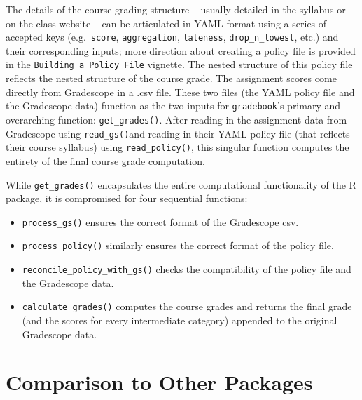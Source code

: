 \documentclass[10pt,a4paper,onecolumn]{article}
\begin{document}
The details of the course grading structure -- usually detailed in the
syllabus or on the class website -- can be articulated in YAML format
using a series of accepted keys (e.g.~\texttt{score},
\texttt{aggregation}, \texttt{lateness}, \texttt{drop\_n\_lowest}, etc.)
and their corresponding inputs; more direction about creating a policy
file is provided in the \texttt{Building\ a\ Policy\ File} vignette. The
nested structure of this policy file reflects the nested structure of
the course grade. The assignment scores come directly from Gradescope in
a .csv file. These two files (the YAML policy file and the Gradescope
data) function as the two inputs for \texttt{gradebook}'s primary and
overarching function: \texttt{get\_grades()}. After reading in the
assignment data from Gradescope using \texttt{read\_gs()}and reading in
their YAML policy file (that reflects their course syllabus) using
\texttt{read\_policy()}, this singular function computes the entirety of
the final course grade computation.

While \texttt{get\_grades()} encapsulates the entire computational
functionality of the R package, it is compromised for four sequential
functions:

\begin{itemize}
\item
  \texttt{process\_gs()} ensures the correct format of the Gradescope
  csv.
\item
  \texttt{process\_policy()} similarly ensures the correct format of the
  policy file.
\item
  \texttt{reconcile\_policy\_with\_gs()} checks the compatibility of the
  policy file and the Gradescope data.
\item
  \texttt{calculate\_grades()} computes the course grades and returns
  the final grade (and the scores for every intermediate category)
  appended to the original Gradescope data.
\end{itemize}

\section{Comparison to Other
Packages}\label{comparison-to-other-packages}
\end{document}
